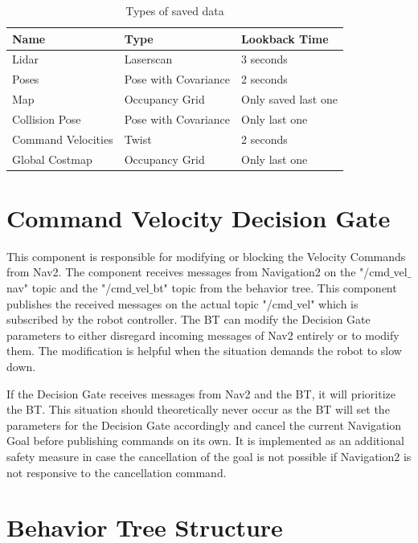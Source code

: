 \begin{table}[ht]
	\centering
	\caption{Types of saved data}
	\label{tab:data_backup_types}
	\renewcommand{\arraystretch}{1.5}
		\begin{tabular}{ | l | l | l | }
	 	\hline
	 	\textbf{Name} & \textbf{Type} & \textbf{Lookback Time} \\ 
	 	\hline
	 	Lidar & Laserscan & 3 seconds \\
	 	\hline
	 	Poses & Pose with Covariance & 2 seconds\\ 
	 	\hline
	 	Map & Occupancy Grid & Only saved last one \\ 
	 	\hline
	 	Collision Pose & Pose with Covariance & Only last one \\
	 	\hline
	 	Command Velocities & Twist & 2 seconds\\
	 	\hline 	
	 	Global Costmap & Occupancy Grid & Only last one \\
	 	\hline
		\end{tabular}
\end{table}

\section{Command Velocity Decision Gate}

This component is responsible for modifying or blocking the Velocity Commands from Nav2. The component receives messages from Navigation2 on the "/cmd$\_$vel$\_$nav" topic and the "/cmd$\_$vel$\_$bt" topic from the behavior tree. This component publishes the received messages on the actual topic "/cmd$\_$vel" which is subscribed by the robot controller.  The BT can modify the Decision Gate parameters to either disregard incoming messages of Nav2 entirely or to modify them. The modification is helpful when the situation demands the robot to slow down. 

If the Decision Gate receives messages from Nav2 and the BT, it will prioritize the BT. This situation should theoretically never occur as the BT will set the parameters for the Decision Gate accordingly and cancel the current Navigation Goal before publishing commands on its own. It is implemented as an additional safety measure in case the cancellation of the goal is not possible if Navigation2 is not responsive to the cancellation command. 

\section{Behavior Tree Structure}

